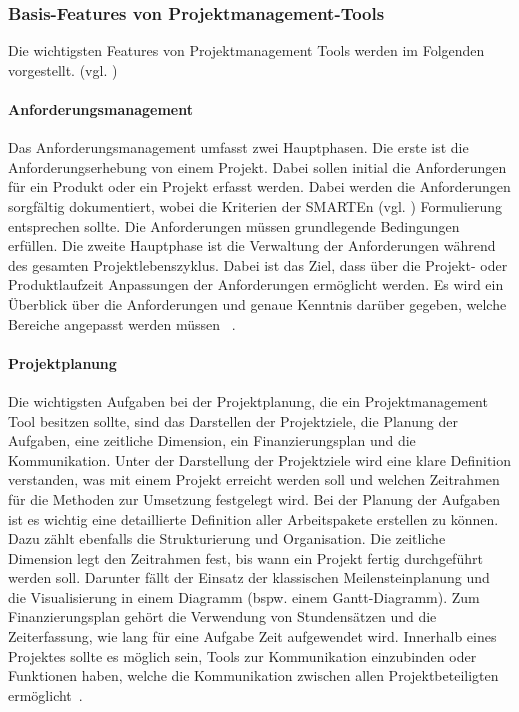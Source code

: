 \documentclass[sigconf, nonacm]{acmart}
\begin{document}
\subsubsection{Basis-Features von Projektmanagement-Tools}
Die wichtigsten Features von Projektmanagement Tools werden im Folgenden vorgestellt. (vgl. \cite{noauthor_projektmanagement_nodate})

\paragraph{Anforderungsmanagement}
Das Anforderungsmanagement umfasst zwei Hauptphasen. Die erste ist die Anforderungserhebung von einem Projekt. Dabei sollen initial die Anforderungen für ein Produkt oder ein Projekt erfasst werden. Dabei werden die Anforderungen sorgfältig dokumentiert, wobei die Kriterien der SMARTEn (vgl. \cite{drucker_people_1995}) Formulierung entsprechen sollte. Die Anforderungen müssen grundlegende Bedingungen erfüllen.
Die zweite Hauptphase ist die Verwaltung der Anforderungen während des gesamten Projektlebenszyklus.
Dabei ist das Ziel, dass über die Projekt- oder Produktlaufzeit Anpassungen der Anforderungen ermöglicht werden. Es wird ein Überblick über die Anforderungen und genaue Kenntnis darüber gegeben, welche Bereiche angepasst werden müssen ~\cite{venzmer_anforderungsmanagement-tool_2020}.

\paragraph{Projektplanung}
Die wichtigsten Aufgaben bei der Projektplanung, die ein Projektmanagement Tool besitzen sollte, sind das Darstellen der Projektziele, die Planung der Aufgaben, eine zeitliche Dimension, ein Finanzierungsplan und die Kommunikation. Unter der Darstellung der Projektziele wird eine klare Definition verstanden, was mit einem Projekt erreicht werden soll und welchen Zeitrahmen für die Methoden zur Umsetzung festgelegt wird. Bei der Planung der Aufgaben ist es wichtig eine detaillierte Definition aller Arbeitspakete erstellen zu können. Dazu zählt ebenfalls die Strukturierung und Organisation. Die zeitliche Dimension legt den Zeitrahmen fest, bis wann ein Projekt fertig durchgeführt werden soll. Darunter fällt der Einsatz der klassischen Meilensteinplanung und die Visualisierung in einem Diagramm (bspw. einem Gantt-Diagramm). Zum Finanzierungsplan gehört die Verwendung von Stundensätzen und die Zeiterfassung, wie lang für eine Aufgabe Zeit aufgewendet wird. Innerhalb eines Projektes sollte es möglich sein, Tools zur Kommunikation einzubinden oder Funktionen haben, welche die Kommunikation zwischen allen Projektbeteiligten ermöglicht~\cite{venzmer_projektplaner-software_2020}.
\end{document}
